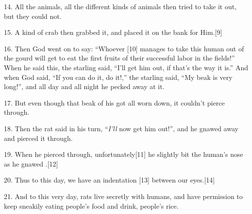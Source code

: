 {\LARGE{}14. All the animals, all the different kinds of animals then tried to
take it out, but they could not.}

{\LARGE{}15. A kind of crab then grabbed it, and placed it on the bank for Him.[9]}

{\LARGE{}16. Then God went on to say: ``Whoever [10] manages to take this human
out of the gourd will get to eat the first fruits of their successful labor in
the fields!'' When he said this, the starling said, ``I'll get him out, if that's
the way it is.'' And when God said, ``If you can do it, do it!,'' the starling
said, ``My beak is very long!'', and all day and all night he pecked away at it.}

{\LARGE{}17. But even though that beak of his got all worn down, it couldn't pierce
through.}

{\LARGE{}18. Then the rat said in his turn, ``}{\LARGE{}\textit{I'll}}{\LARGE{}
now get him out!'', and he gnawed away and pierced it through.}

{\LARGE{}19. When he pierced through, unfortunately[11] he slightly bit the human's
nose as he gnawed .[12]}

{\LARGE{}20. Thus to this day, we have an indentation [13] between our eyes.[14]}

{\LARGE{}21. And to this very day, rats live secretly with humans, and have permission
to keep sneakily eating people's food and drink, people's rice.}

